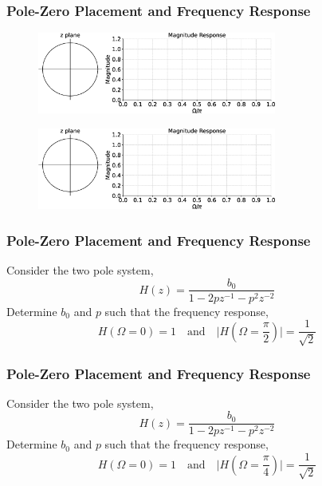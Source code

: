 \documentclass[aspectratio=169]{beamer}
\begin{document}
\begin{frame}[t]
  \frametitle{Pole-Zero Placement and Frequency Response}
  \begin{figure}
  \centering
  \includegraphics[width=0.7\textwidth]{img/freqpz.eps}
  \end{figure}

  \begin{figure}
  \centering
  \includegraphics[width=0.7\textwidth]{img/freqpz.eps}
  \end{figure}
\end{frame}


\begin{frame}[t]
  \frametitle{Pole-Zero Placement and Frequency Response}
  Consider the two pole system,
  \[ H(z) = \frac{b_0}{1 - 2pz^{-1} - p^2z^{-2}} \]
  Determine $b_0$ and $p$ such that the frequency response,
   \[ H(\Omega = 0) = 1 \quad \text{and} \quad \big \vert H(\Omega = \frac{\pi}{2}) \big \vert = \frac{1}{\sqrt{2}} \]
\end{frame}


\begin{frame}[t]
  \frametitle{}
  
\end{frame}


\begin{frame}[t]
  \frametitle{Pole-Zero Placement and Frequency Response}
  Consider the two pole system,
  \[ H(z) = \frac{b_0}{1 - 2pz^{-1} - p^2z^{-2}} \]
  Determine $b_0$ and $p$ such that the frequency response,
   \[ H(\Omega = 0) = 1 \quad \text{and} \quad \big \vert H(\Omega = \frac{\pi}{4}) \big \vert = \frac{1}{\sqrt{2}} \]
\end{frame}


\begin{frame}[t]
  \frametitle{}
  
\end{frame}
\end{document}

